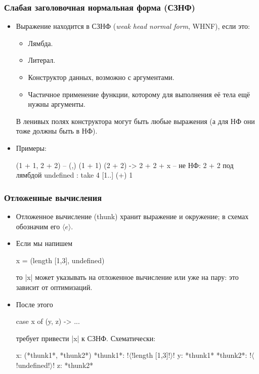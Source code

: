 \documentclass[11pt]{beamer}
\begin{document}
\begin{frame}[fragile]
  \frametitle{Слабая заголовочная нормальная форма (СЗНФ)}
  \begin{itemize}
    \item Выражение находится в СЗНФ (\emph{weak head normal form}, WHNF), если это:
          \begin{itemize}
            \item Лямбда.
            \item Литерал.
            \item Конструктор данных, возможно с аргументами.
            \item Частичное применение функции, которому для выполнения её тела ещё нужны аргументы.
          \end{itemize}
          В ленивых полях конструктора могут быть любые выражения \pause
          (а для НФ они тоже должны быть в НФ).
    \item Примеры: \pause
          \begin{haskellsmall}
            (1 + 1, 2 + 2)       -- (,) (1 + 1) (2 + 2)
            \x -> 2 + 2 + x      -- не НФ: 2 + 2 под лямбдой
            undefined : take 4 [1..]
            (+) 1
          \end{haskellsmall}
  \end{itemize}
\end{frame}

\begin{frame}[fragile]
  \frametitle{Отложенные вычисления}
  \begin{itemize}
    \item Отложенное вычисление (thunk) хранит выражение и окружение; в схемах обозначим его $\langle e\rangle$.
    \item Если мы напишем
          \begin{haskell}
            x = (length [1,3], undefined)
          \end{haskell}
          то \haskinline|x| может указывать на отложенное вычисление или уже на пару: это зависит от оптимизаций.
    \item После этого
          \begin{haskell}
            case x of
              (y, z) -> ...
          \end{haskell}
          требует привести \haskinline|x| к СЗНФ. Схематически: \pause
          \begin{haskell}
            x: (*thunk1*, *thunk2*)  *thunk1*: !$\langle$!length [1,3]!$\rangle$!
            y: *thunk1*              *thunk2*: !$\langle$!undefined!$\rangle$!
            z: *thunk2*
          \end{haskell}

  \end{itemize}
\end{frame}
\end{document}
